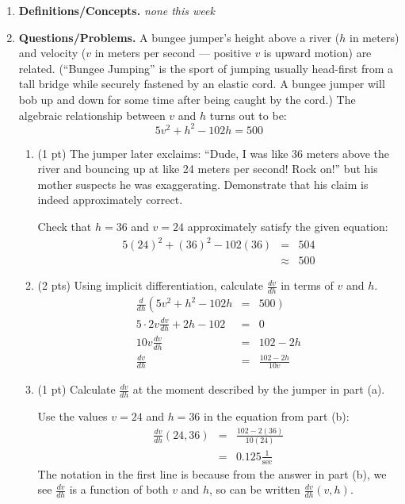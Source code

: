 \documentclass[11pt,letterpaper]{article}
\begin{document}
\begin{enumerate}
\item  \textbf{Definitions/Concepts.} \emph{none this week}

\vspace{1pc}
\item \textbf{Questions/Problems.}  \noindent A bungee jumper's height above a river ($h$ in meters) and velocity ($v$ in meters per
second --- positive $v$ is upward motion) are related. (``Bungee Jumping'' is the sport of jumping usually head-first from a tall
bridge while securely fastened by an elastic cord. A bungee jumper will bob up and down for some time after being caught by the
cord.)  The algebraic relationship between $v$ and $h$ turns out to be:
\[5v^2 + h^2 - 102h = 500\]

\begin{enumerate}
\item (1 pt)  The jumper later exclaims: ``Dude, I was like 36 meters above the river and bouncing up at like 24 meters per second! Rock on!'' but his mother suspects he was exaggerating. Demonstrate that his claim is indeed approximately correct. 

\vspace{.5pc}
Check that $h=36$ and $v=24$ approximately satisfy the given equation:
\begin{eqnarray*}
 5(24)^2+(36)^2-102(36) &=& 504 \\
&\approx & 500
\end{eqnarray*}

\vspace{1pc}
\item (2 pts)  Using implicit differentiation, calculate $\frac{dv}{dh}$ in terms of $v$ and $h$.
\begin{eqnarray*}
 \frac{d}{dh} \left(5v^2+h^2-102h\right. &=& \left.500\right) \\
5\cdot 2v\frac{dv}{dh}+2h-102 &=& 0 \\
10v\frac{dv}{dh} &=& 102-2h \\
\frac{dv}{dh} &=& \frac{102-2h}{10v}
\end{eqnarray*}

\vspace{1pc}
\item (1 pt)  Calculate $\frac{dv}{dh}$ at the moment described by the jumper in part (a).

\vspace{.5pc}
Use the values $v=24$ and $h=36$ in the equation from part (b):
\begin{eqnarray*}
 \frac{dv}{dh}\left(24,36\right) &=& \frac{102-2(36)}{10(24)} \\
&=& 0.125 \frac{1}{\text{sec}}
\end{eqnarray*}
The notation in the first line is because from the answer in part (b), we see $\frac{dv}{dh}$ is a function of both $v$ and $h$, so can be written $\frac{dv}{dh}\left(v,h\right)$.
\end{enumerate}


\end{enumerate}
\end{document}
